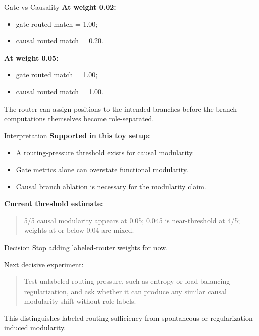 \documentclass[aspectratio=169]{beamer}
\begin{document}
\begin{frame}{Gate vs Causality}
  \textbf{At weight 0.02:}
  \begin{itemize}
    \item gate routed match = 1.00;
    \item causal routed match = 0.20.
  \end{itemize}

  \vspace{0.6em}
  \textbf{At weight 0.05:}
  \begin{itemize}
    \item gate routed match = 1.00;
    \item causal routed match = 1.00.
  \end{itemize}

  \vspace{0.8em}
  The router can assign positions to the intended branches before the branch
  computations themselves become role-separated.
\end{frame}

\begin{frame}{Interpretation}
  \textbf{Supported in this toy setup:}
  \begin{itemize}
    \item A routing-pressure threshold exists for causal modularity.
    \item Gate metrics alone can overstate functional modularity.
    \item Causal branch ablation is necessary for the modularity claim.
  \end{itemize}

  \vspace{0.6em}
  \textbf{Current threshold estimate:}
  \begin{quote}
    5/5 causal modularity appears at 0.05; 0.045 is near-threshold at 4/5;
    weights at or below 0.04 are mixed.
  \end{quote}
\end{frame}

\begin{frame}{Decision}
  Stop adding labeled-router weights for now.

  \vspace{0.8em}
  Next decisive experiment:
  \begin{quote}
    Test unlabeled routing pressure, such as entropy or load-balancing
    regularization, and ask whether it can produce any similar causal modularity
    shift without role labels.
  \end{quote}

  \vspace{0.8em}
  This distinguishes labeled routing sufficiency from spontaneous or
  regularization-induced modularity.
\end{frame}
\end{document}
